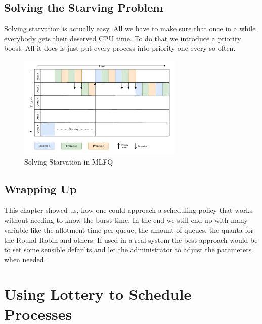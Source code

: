\section{Solving the Starving Problem}

Solving starvation is actually easy.
All we have to make sure that once in a while everybody gets their deserved CPU time.
To do that we introduce a priority boost. All it does is just put every process into priority one every so often.

\begin{figure}[h]
    \centering
    \includegraphics[width=0.7\textwidth]{Assets/MLFQ-Example-4.pdf}
    \caption{Solving Starvation in MLFQ}
    \label{fig:mlfq-example-4}
\end{figure}

\section{Wrapping Up}

This chapter showed us, how one could approach a scheduling policy that works without needing to know the burst time.
In the end we still end up with many variable like the allotment time per queue, the amount of queues, the quanta for the Round Robin and others.
If used in a real system the best approach would be to set some sensible defaults and let the administrator to adjust the parameters when needed.

\chapter{Using Lottery to Schedule Processes}